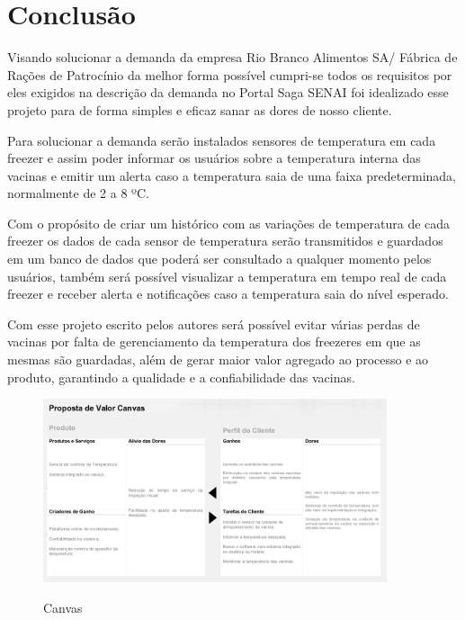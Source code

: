 \chapter{Conclusão}

    Visando solucionar a demanda da empresa
    Rio Branco Alimentos SA/ Fábrica de Rações de Patrocínio
    da melhor forma possível cumpri-se todos os requisitos 
    por eles exigidos na descrição da demanda no Portal Saga SENAI
    foi idealizado esse projeto para de forma simples e eficaz 
    sanar as dores de nosso cliente.

    Para solucionar a demanda serão instalados sensores de 
    temperatura em cada freezer
    e assim poder informar os usuários sobre a temperatura
    interna das vacinas e emitir um alerta caso a temperatura
    saia de uma faixa predeterminada, normalmente de 2 a 8 ºC.

    Com o propósito de criar um histórico com as variações de 
    temperatura de cada freezer os dados de cada sensor de 
    temperatura serão transmitidos e guardados em um 
    banco de dados que poderá ser consultado a qualquer momento
    pelos usuários, também será possível visualizar a temperatura
    em tempo real de cada freezer e receber alerta e notificações
    caso a temperatura saia do nível esperado.

    Com esse projeto escrito pelos autores 
    será possível evitar várias perdas de vacinas por 
    falta de gerenciamento da temperatura dos freezeres
    em que as mesmas são guardadas, além de gerar maior valor 
    agregado ao processo e ao produto, garantindo 
    a qualidade e a confiabilidade das vacinas.

    \begin{figure}
        \caption{Canvas}
        \centering
        \includegraphics[width=0.9\textwidth]{img/canvas.png}
        \label{fig:canvas}
    \end{figure}
